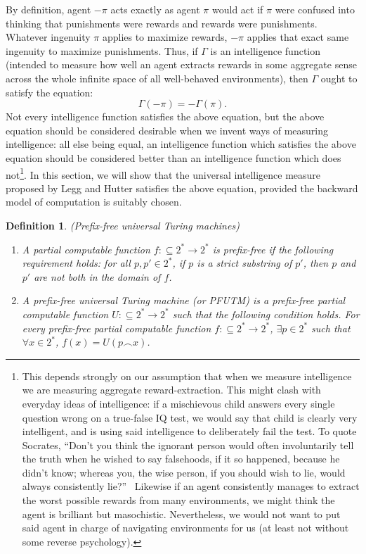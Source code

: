 \documentclass{article}
\newtheorem{definition}[theorem]{Definition}
\begin{document}
By definition, agent $-\pi$ acts exactly as agent $\pi$ would
act if $\pi$ were confused into thinking that punishments were rewards
and rewards were punishments.
Whatever ingenuity $\pi$ applies to maximize rewards,
$-\pi$ applies that exact same ingenuity to maximize punishments.
Thus, if $\Gamma$ is an intelligence function (intended to measure how
well an agent extracts rewards in some aggregate sense across the whole
infinite space of all well-behaved environments), then $\Gamma$ ought
to satisfy the equation:
\[
    \Gamma(-\pi) = -\Gamma(\pi).
\]
Not every intelligence function satisfies the above equation, but the
above equation should be considered desirable when we
invent ways of measuring intelligence: all else being equal, an
intelligence function which satisfies the above equation should be
considered better than an intelligence function which does
not\footnote{This depends strongly on our assumption that when we
measure intelligence we are measuring aggregate reward-extraction. This might clash
with everyday ideas of intelligence: if a mischievous child answers every single
question wrong on a true-false IQ test, we would say that child is clearly very
intelligent, and is using said intelligence to deliberately fail the test.
To quote Socrates, ``Don't you think the ignorant person would often involuntarily
tell the truth when he wished to say falsehoods, if it so happened, because he
didn't know; whereas you, the wise person, if you should wish to lie,
would always consistently lie?''\ \cite{lesserhippias}
Likewise if an agent consistently manages to extract the worst possible rewards
from many environments, we might think the agent is brilliant but
masochistic.
Nevertheless, we would not want to put said agent
in charge of navigating environments for us (at least not without some
reverse psychology).}.
In this section, we will show that the universal intelligence measure
proposed by Legg and Hutter satisfies the above equation, provided the
backward model of computation is suitably chosen.

\begin{definition}
    (Prefix-free universal Turing machines)
    \begin{enumerate}
        \item A partial computable function $f:\subseteq 2^*\to 2^*$
        is \emph{prefix-free} if the following requirement holds:
        for all $p,p'\in 2^*$, if $p$ is a strict substring of $p'$,
        then $p$ and $p'$ are not both in the domain of $f$.
        \item A \emph{prefix-free universal Turing machine}
        (or \emph{PFUTM}) is a prefix-free
        partial computable function $U:\subseteq 2^*\to 2^*$
        such that the following condition holds.
        For every prefix-free partial computable function
        $f:\subseteq 2^*\to 2^*$, $\exists p\in 2^*$ such that
        $\forall x\in 2^*$, $f(x)=U(p\frown x)$.
    \end{enumerate}
\end{definition}
\end{document}
